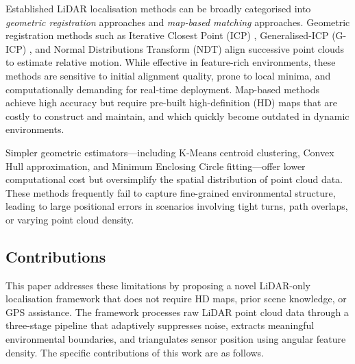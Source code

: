 \documentclass[lettersize,journal]{IEEEtran}
\begin{document}
Established LiDAR localisation methods can be broadly categorised into
\emph{geometric registration} approaches and \emph{map-based matching} approaches.
Geometric registration methods such as Iterative Closest Point (ICP)
\cite{besl1992method}, Generalised-ICP (G-ICP) \cite{segal2009generalized}, and
Normal Distributions Transform (NDT) \cite{biber2003normal} align successive point
clouds to estimate relative motion. While effective in feature-rich environments, these
methods are sensitive to initial alignment quality, prone to local minima, and
computationally demanding for real-time deployment. Map-based methods \cite{levinson2010robust,wolcott2017robust} achieve high accuracy but require pre-built
high-definition (HD) maps that are costly to construct and maintain, and which quickly
become outdated in dynamic environments.

Simpler geometric estimators---including K-Means centroid clustering, Convex Hull
approximation, and Minimum Enclosing Circle fitting---offer lower computational cost
but oversimplify the spatial distribution of point cloud data. These methods frequently
fail to capture fine-grained environmental structure, leading to large positional errors
in scenarios involving tight turns, path overlaps, or varying point cloud density.

\subsection{Contributions}

This paper addresses these limitations by proposing a novel LiDAR-only localisation
framework that does not require HD maps, prior scene knowledge, or GPS assistance. The
framework processes raw LiDAR point cloud data through a three-stage pipeline that
adaptively suppresses noise, extracts meaningful environmental boundaries, and
triangulates sensor position using angular feature density. The specific contributions
of this work are as follows.
\end{document}

